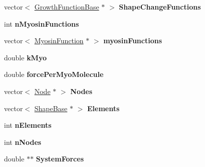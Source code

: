 \begin{DoxyCompactItemize}
\item 
\hypertarget{classSimulation_a92ba3cb43bcbabf7e617755a28cb648b}{}vector$<$ \hyperlink{classGrowthFunctionBase}{Growth\+Function\+Base} $\ast$ $>$ {\bfseries Shape\+Change\+Functions}\label{classSimulation_a92ba3cb43bcbabf7e617755a28cb648b}

\item 
\hypertarget{classSimulation_a99cf859f33b779f43f46e23df7227803}{}int {\bfseries n\+Myosin\+Functions}\label{classSimulation_a99cf859f33b779f43f46e23df7227803}

\item 
\hypertarget{classSimulation_aa662969fe152e645993a23834a4e6920}{}vector$<$ \hyperlink{classMyosinFunction}{Myosin\+Function} $\ast$ $>$ {\bfseries myosin\+Functions}\label{classSimulation_aa662969fe152e645993a23834a4e6920}

\item 
\hypertarget{classSimulation_a3f011f0be023bdb2dcf0e7535dc88789}{}double {\bfseries k\+Myo}\label{classSimulation_a3f011f0be023bdb2dcf0e7535dc88789}

\item 
\hypertarget{classSimulation_a7ed80530f06f7579e8bf3f4f24f685b6}{}double {\bfseries force\+Per\+Myo\+Molecule}\label{classSimulation_a7ed80530f06f7579e8bf3f4f24f685b6}

\item 
\hypertarget{classSimulation_a51e3f02b266fd5156a1d78054f1dac37}{}vector$<$ \hyperlink{classNode}{Node} $\ast$ $>$ {\bfseries Nodes}\label{classSimulation_a51e3f02b266fd5156a1d78054f1dac37}

\item 
\hypertarget{classSimulation_a7731565e1391398dc2f6bd8880719c46}{}vector$<$ \hyperlink{classShapeBase}{Shape\+Base} $\ast$ $>$ {\bfseries Elements}\label{classSimulation_a7731565e1391398dc2f6bd8880719c46}

\item 
\hypertarget{classSimulation_ac18b284c6a4474c0d60eac0eeda97264}{}int {\bfseries n\+Elements}\label{classSimulation_ac18b284c6a4474c0d60eac0eeda97264}

\item 
\hypertarget{classSimulation_aacf54ee7b6003ee9c2831535ff75422c}{}int {\bfseries n\+Nodes}\label{classSimulation_aacf54ee7b6003ee9c2831535ff75422c}

\item 
\hypertarget{classSimulation_a1619473071809021f1fa2c9ce4e51477}{}double $\ast$$\ast$ {\bfseries System\+Forces}\label{classSimulation_a1619473071809021f1fa2c9ce4e51477}


\end{DoxyCompactItemize}
